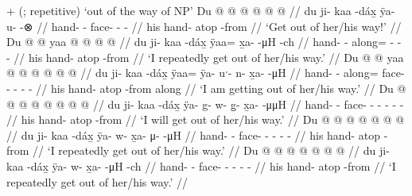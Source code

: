 \documentclass[12pt,letterpaper,oneside,article]{memoir}
\begin{document}
\pex\label{ex:motderiv-intro-zoutway}%
\a\label{ex:motderiv-intro-zoutway-deriv}%
%
	 +  (;  repetitive) ‘out of the way of NP’
\a\label{ex:motderiv-intro-zoutway-imp}%
%
\begingl
	\gla	Du  @ {} @ {} 
		 @ {} @ {} @ {} @ {} //
	\glb	du ji- kaa -dáx̱
		ÿa- u- {}  -⊗ //
	\glc	{} hand-  -
		face- - \·  - //
	\gld	his hand- atop -from
		 {} {} {} {} //
	\glft	‘Get out of her/his way!’
		//
\endgl
\a\label{ex:motderiv-intro-zoutway-repimpfv}%
%
\begingl
	\gla	Du  @ {} @ {} 
		yaa @  @ {} @ {} @ {} //
	\glb	du ji- kaa -dáx̱
		ÿaa= x̱a-  -μH -ch //
	\glc	{} hand-  -
		along= -  - - //
	\gld	his hand- atop -from
		 {} {} {} //
	\glft	‘I repeatedly get out of her/his way.’
		//
\endgl
\a\label{ex:motderiv-intro-zoutway-prog}%
%
\begingl
	\gla	Du  @ {} @ {} 
		yaa @  @ {} @ {} @ {} @ {} @ {} //
	\glb	du ji- kaa -dáx̱
		ÿaa= ÿa- uˑ- n- x̱a-  -μH //
	\glc	{} hand-  -
		along= face- - - -  - //
	\gld	his hand- atop -from
		along  {} {} {} {} {} //
	\glft	‘I am getting out of her/his way.’
		//
\endgl
\a\label{ex:motderiv-intro-zoutway-prosp}%
%
\begingl
	\gla	Du  @ {} @ {} 
		 @ {} @ {} @ {} @ {} @ {} @ {} //
	\glb	du ji- kaa -dáx̱
		ÿa- g- w- g̱- x̱a-  -μμH //
	\glc	{} hand-  -
		face- - - - -  - //
	\gld	his hand- atop -from
		 {} {} {} {} {} {} //
	\glft	‘I will get out of her/his way.’
		//
\endgl
\a\label{ex:motderiv-intro-zoutway-pfv}%
%
\begingl
	\gla	Du  @ {} @ {} 
		 @ {} @ {} @ {} @ {} @ {} //
	\glb	du ji- kaa -dáx̱
		ÿa- w- x̱a- μ-  -μH //
	\glc	{} hand-  -
		face- - - -  - //
	\gld	his hand- atop -from
		 {} {} {} {} {} //
	\glft	‘I repeatedly get out of her/his way.’
		//
\endgl
\a\label{ex:motderiv-intro-zoutway-hab}%
%
\begingl
	\gla	Du  @ {} @ {} 
		 @ {} @ {} @ {} @ {} @ {} //
	\glb	du ji- kaa -dáx̱
		ÿa- w- x̱a-  -μH -ch //
	\glc	{} hand-  -
		face- - -  - - //
	\gld	his hand- atop -from
		 {} {} {} {} {} //
	\glft	‘I repeatedly get out of her/his way.’
		//
\endgl
\xe
\end{document}
